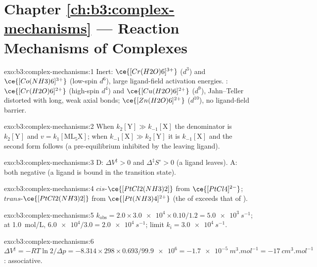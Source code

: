 \section*{Chapter \ref{ch:b3:complex-mechanisms} --- Reaction Mechanisms of Complexes}

\begin{solution}{exo:b3:complex-mechanisms:1}
Inert: $\ce{[Cr(H2O)6]^{3+}}$ ($d^3$) and $\ce{[Co(NH3)6]^{3+}}$ (low-spin $d^6$), large ligand-field
activation energies. : $\ce{[Cr(H2O)6]^{2+}}$ (high-spin $d^4$) and $\ce{[Cu(H2O)6]^{2+}}$ ($d^9$),
Jahn--Teller distorted with long, weak axial bonds; $\ce{[Zn(H2O)6]^{2+}}$ ($d^{10}$), no ligand-field
barrier.
\end{solution}

\begin{solution}{exo:b3:complex-mechanisms:2}
When $k_2[\mathrm Y] \gg k_{-1}[\mathrm X]$ the denominator is $k_2[\mathrm Y]$ and $v = k_1[\mathrm{ML_5X}]$; when $k_{-1}[\mathrm X] \gg k_2[\mathrm Y]$ it is
$k_{-1}[\mathrm X]$ and the second form follows (a pre-equilibrium inhibited by the leaving
ligand).
\end{solution}

\begin{solution}{exo:b3:complex-mechanisms:3}
D: $\Delta V^{\ddagger} > 0$ and $\Delta^{\ddagger}S^\circ > 0$ (a ligand leaves). A: both negative (a ligand is bound in the
transition state).
\end{solution}

\begin{solution}{exo:b3:complex-mechanisms:4}
$cis$-$\ce{[PtCl2(NH3)2]}$ from $\ce{[PtCl4]^{2-}}$; $trans$-$\ce{[PtCl2(NH3)2]}$ from $\ce{[Pt(NH3)4]^{2+}}$ (the
 of  exceeds that of ).
\end{solution}

\begin{solution}{exo:b3:complex-mechanisms:5}
$k_{\mathrm{obs}} = 2.0 \times \num{3.0e4} \times 0.10/1.2 = \qty{5.0e3}{s^{-1}}$; at \qty{1.0}{mol/L}, $\num{6.0e4}/3.0 = \qty{2.0e4}{s^{-1}}$; limit
$k_i = \qty{3.0e4}{s^{-1}}$.
\end{solution}

\begin{solution}{exo:b3:complex-mechanisms:6}
$\Delta V^{\ddagger} = -RT\ln2/\Delta p = -8.314 \times 298 \times 0.693/\num{99.9e6} = \qty{-1.7e-5}{m^3.mol^{-1}} = \qty{-17}{cm^3.mol^{-1}}$:
associative.
\end{solution}

